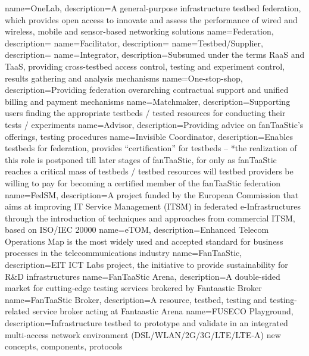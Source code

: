 {
  name=OneLab,
  description={A general-purpose infrastructure testbed federation, which provides open access to innovate and assess the performance of wired and wireless, mobile and sensor-based networking solutions}
}
{
    name={Federation},
    description={}
}
{
    name={Facilitator},
    description={}
}
{
    name={Testbed/Supplier},
    description={}
}
{
    name={Integrator},
    description={Subsumed under the terms \ac{RaaS} and \ac{TaaS}, providing cross-testbed access control, testing and experiment control, results gathering and analysis mechanisms}
}
{
    name={One-stop-shop},
    description={Providing federation overarching contractual support and unified billing and payment mechanisms}
}
{
    name={Matchmaker},
    description={Supporting users finding the appropriate testbeds / tested resources for conducting their tests / experiments}
}
{
    name={Advisor},
    description={Providing advice on fanTaaStic’s offerings, testing procedures}
}
{
    name={Invisible Coordinator},
    description={Enables testbeds for federation, provides “certification” for testbeds – *the realization of this role is postponed till later stages of fanTaaStic, for only as fanTaaStic reaches a critical mass of testbeds / testbed resources will testbed providers be willing to pay for becoming a certified member of the fanTaaStic federation}
}
{
    name={FedSM},
    description={A project funded by the European Commission that aims at improving IT Service Management (ITSM) in federated e-Infrastructures through the introduction of techniques and approaches from commercial ITSM, based on ISO/IEC 20000}
}
{
    name={eTOM},
    description={Enhanced Telecom Operations Map is the most widely used and accepted standard for business processes in the telecommunications industry}
}
{
    name={FanTaaStic},
    description={EIT ICT Labs project, the initiative to provide sustainability for R\&D infrastructures}
}
{
    name={FanTaaStic Arena},
    description={A double-sided market for cutting-edge testing services brokered by Fantaastic Broker}
}
{
    name={FanTaaStic Broker},
    description={A resource, testbed, testing and testing-related service broker acting at Fantaastic Arena}
}
{
    name={FUSECO Playground},
    description={Infrastructure testbed to prototype and validate in an integrated multi-access network environment (DSL/WLAN/2G/3G/LTE/LTE-A) new concepts, components, protocols}
}
